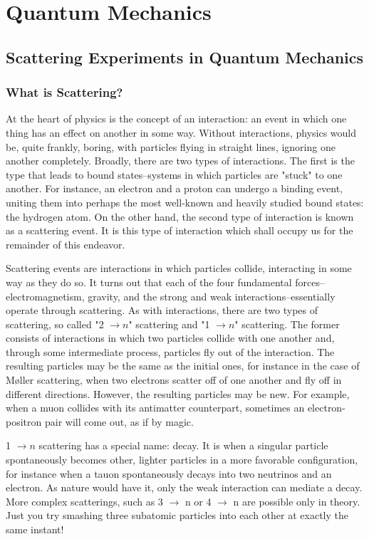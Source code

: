 \documentclass{report}
\begin{document}
\newpage
\tableofcontents

\newpage
\part{Quantum Mechanics}
\chapter{Scattering Experiments in Quantum Mechanics}
\section{What is Scattering?}
At the heart of physics is the concept of an interaction: an event in which one thing has an effect on another in some way. Without interactions, physics would be, quite frankly, boring, with particles flying in straight lines, ignoring one another completely. Broadly, there are two types of interactions. The first is the type that leads to bound states--systems in which particles are "stuck" to one another. For instance, an electron and a proton can undergo a binding event, uniting them into perhaps the most well-known and heavily studied bound states: the hydrogen atom. On the other hand, the second type of interaction is known as a scattering event. It is this type of interaction which shall occupy us for the remainder of this endeavor.

Scattering events are interactions in which particles collide, interacting in some way as they do so. It turns out that each of the four fundamental forces--electromagnetism, gravity, and the strong and weak interactions--essentially operate through scattering. As with interactions, there are two types of scattering, so called "2 $\rightarrow n$" scattering and "1 $\rightarrow n$" scattering. The former consists of interactions in which two particles collide with one another and, through some intermediate process, particles fly out of the interaction. The resulting particles may be the same as the initial ones, for instance in the case of Møller scattering, when two electrons scatter off of one another and fly off in different directions. However, the resulting particles may be new. For example, when a muon collides with its antimatter counterpart, sometimes an electron-positron pair will come out, as if by magic.

1 $\rightarrow n$ scattering has a special name: decay. It is when a singular particle spontaneously becomes other, lighter particles in a more favorable configuration, for instance when a tauon spontaneously decays into two neutrinos and an electron. As nature would have it, only the weak interaction can mediate a decay. More complex scatterings, such as 3 $\rightarrow$ n or 4 $\rightarrow$ n are possible only in theory. Just you try smashing three subatomic particles into each other at exactly the same instant!
\end{document}
